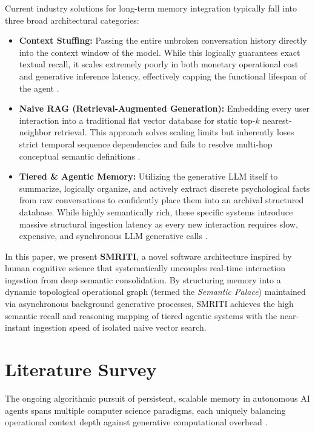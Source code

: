 \documentclass[conference]{IEEEtran}
\begin{document}
Current industry solutions for long-term memory integration typically fall into three broad architectural categories:
\begin{itemize}
    \item \textbf{Context Stuffing:} Passing the entire unbroken conversation history directly into the context window of the model. While this logically guarantees exact textual recall, it scales extremely poorly in both monetary operational cost and generative inference latency, effectively capping the functional lifespan of the agent \cite{anthropic2023claude}.
    \item \textbf{Naive RAG (Retrieval-Augmented Generation):} Embedding every user interaction into a traditional flat vector database for static top-$k$ nearest-neighbor retrieval. This approach solves scaling limits but inherently loses strict temporal sequence dependencies and fails to resolve multi-hop conceptual semantic definitions \cite{lewis2020retrieval}.
    \item \textbf{Tiered \& Agentic Memory:} Utilizing the generative LLM itself to summarize, logically organize, and actively extract discrete psychological facts from raw conversations to confidently place them into an archival structured database. While highly semantically rich, these specific systems introduce massive structural ingestion latency as every new interaction requires slow, expensive, and synchronous LLM generative calls \cite{packer2023memgpt}.
\end{itemize}

In this paper, we present \textbf{SMRITI}, a novel software architecture inspired by human cognitive science \cite{tulving1972episodic} that systematically uncouples real-time interaction ingestion from deep semantic consolidation. By structuring memory into a dynamic topological operational graph (termed the \textit{Semantic Palace}) maintained via asynchronous background generative processes, SMRITI achieves the high semantic recall and reasoning mapping of tiered agentic systems with the near-instant ingestion speed of isolated naive vector search.

\section{Literature Survey}

The ongoing algorithmic pursuit of persistent, scalable memory in autonomous AI agents spans multiple computer science paradigms, each uniquely balancing operational context depth against generative computational overhead \cite{zhao2023expel}.
\end{document}
